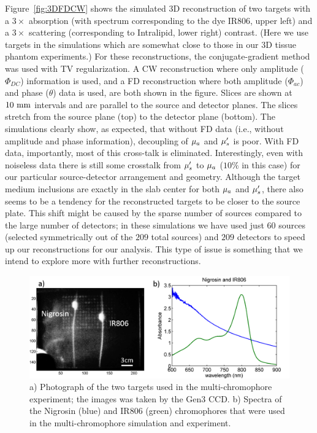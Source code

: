 Figure~\ref{fig:3DFDCW} shows the simulated 3D reconstruction of two targets with a $3\times$ absorption (with spectrum corresponding to the dye IR806, upper left) and a $3\times$ scattering (corresponding to Intralipid, lower right) contrast. (Here we use targets in the simulations which are somewhat close to those in our 3D tissue phantom experiments.) For these reconstructions, the conjugate-gradient method was used with TV regularization. A CW reconstruction where only amplitude ($\Phi_{DC}$) information is used, and a FD reconstruction where both amplitude ($\Phi_{ac}$) and phase ($\theta$) data is used, are both shown in the figure. Slices are shown at $10~\rm{mm}$ intervals and are parallel to the source and detector planes. The slices stretch from the source plane (top) to the detector plane (bottom). The simulations clearly show, as expected, that without FD data (i.e., without amplitude and phase information), decoupling of $\mu_a$ and $\mu_s^{\prime}$ is poor. With FD data, importantly, most of this cross-talk is eliminated. Interestingly, even with noiseless data there is still some crosstalk from $\mu_s^{\prime}$ to $\mu_a$ ($10\%$ in this case) for our particular source-detector arrangement and geometry. Although the target medium inclusions are exactly in the slab center for both $\mu_a$ and $\mu_s^{\prime}$, there also seems to be a tendency for the reconstructed targets to be closer to the source plate. This shift might be caused by the sparse number of sources compared to the large number of detectors; in these simulations we have used just $60$ sources (selected symmetrically out of the $209$ total sources) and $209$ detectors to speed up our reconstructions for our analysis. This type of issue is something that we intend to explore more with further reconstructions.
\begin{figure}[t]
\centering
\includegraphics[width=13cm]{./figures/4_Gen3/2chromo.png}
\caption[Two targets used in multichromophore experiment and ink spectras]{a) Photograph of the two targets used in the multi-chromophore experiment; the images was taken by the Gen3 CCD. b) Spectra of the Nigrosin (blue) and IR806 (green) chromophores that were used in the multi-chromophore simulation and experiment.}
\label{fig:2chromo}
\end{figure}


